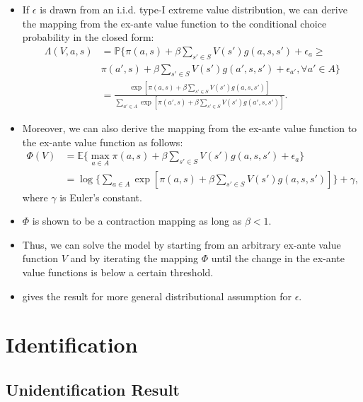 \documentclass[
]{book}
\providecommand{\tightlist}{%
  \setlength{\itemsep}{0pt}\setlength{\parskip}{0pt}}
\begin{document}
\begin{itemize}
\tightlist
\item
  If \(\epsilon\) is drawn from an i.i.d. type-I extreme value distribution, we can derive the mapping from the ex-ante value function to the conditional choice probability in the closed form:
  \begin{equation}
  \begin{split}
  \Lambda(V, a, s) &= \mathbb{P}\{\pi(a , s) + \beta \sum_{s' \in S} V(s') g(a, s, s') + \epsilon_{a} \ge\\
   & \pi(a' , s) + \beta \sum_{s' \in S} V(s') g(a', s, s') + \epsilon_{a'}, \forall a' \in A\}\\
  &=\frac{\exp[\pi(a , s) + \beta \sum_{s' \in S} V(s') g(a, s, s')]}{\sum_{a' \in A} \exp[\pi(a' , s) + \beta \sum_{s' \in S} V(s') g(a', s, s')]}.
  \end{split}
  \end{equation}
\item
  Moreover, we can also derive the mapping from the ex-ante value function to the ex-ante value function as follows:
  \begin{equation}
  \begin{split}
  \Phi(V) &= \mathbb{E}\{\max_{a \in A} \pi(a , s) + \beta \sum_{s' \in S} V(s') g(a, s, s') + \epsilon_{a}\} \\
  &=\log \Bigg\{\sum_{a \in A} \exp[\pi(a , s) + \beta \sum_{s' \in S} V(s') g(a, s, s')] \Bigg\} + \gamma,
  \end{split}
  \end{equation}
  where \(\gamma\) is Euler's constant.
\item
  \(\Phi\) is shown to be a contraction mapping as long as \(\beta < 1\).
\item
  Thus, we can solve the model by starting from an arbitrary ex-ante value function \(V\) and by iterating the mapping \(\Phi\) until the change in the ex-ante value functions is below a certain threshold.
\item
  \citet{rustOptimalReplacementGMC1987} gives the result for more general distributional assumption for \(\epsilon\).
\end{itemize}

\hypertarget{identification}{%
\section{Identification}\label{identification}}

\hypertarget{unidentification-result}{%
\subsection{Unidentification Result}\label{unidentification-result}}
\end{document}
